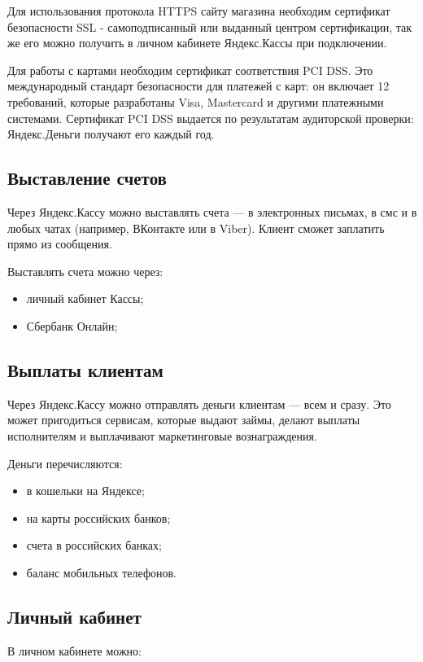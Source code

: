 Для использования протокола HTTPS сайту магазина необходим сертификат безопасности SSL - самоподписанный или выданный центром сертификации, так же его можно получить в личном кабинете Яндекс.Кассы при подключении.


Для работы с картами необходим сертификат соответствия PCI DSS. Это международный стандарт безопасности для платежей с карт: он включает 12 требований, которые разработаны Visa, Mastercard и другими платежными системами. Сертификат PCI DSS выдается по результатам аудиторской проверки: Яндекс.Деньги получают его каждый год.


\subsection{Выставление счетов}\label{sec:pay_accounts}
Через Яндекс.Кассу можно выставлять счета — в электронных письмах, в смс и в любых чатах (например, ВКонтакте или в Viber). Клиент сможет заплатить прямо из сообщения.

Выставлять счета можно через:
\begin{itemize}
  \item личный кабинет Кассы;
  \item Сбербанк Онлайн;  
\end{itemize}


\subsection{Выплаты клиентам}\label{sec:pay_clients}
Через Яндекс.Кассу можно отправлять деньги клиентам — всем и сразу. Это может пригодиться сервисам, которые выдают займы, делают выплаты исполнителям и выплачивают маркетинговые вознаграждения.

Деньги перечисляются:
\begin{itemize}
  \item в кошельки на Яндексе;
  \item на карты российских банков;
  \item счета в российских банках;
  \item баланс мобильных телефонов.
\end{itemize}

\subsection{Личный кабинет}\label{sec:profile}
В личном кабинете можно:

